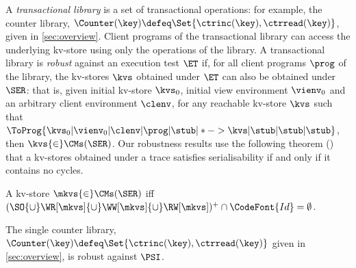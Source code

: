 A {\em transactional library}  is a set of transactional operations: for example, the counter
library, 
$\Counter(\key) \defeq \Set{\ctrinc(\key), \ctrread(\key)}$, given  in \cref{sec:overview}.  Client
programs of the transactional library can access the underlying kv-store using only
the operations of the library.
A transactional library  is \emph{robust} against an execution test $\ET$
if, for all client programs \( \prog \) of the library, 
the kv-stores \( \kvs \) obtained under $\ET$ can also be obtained
under $\SER$:
that is, 
given initial kv-store \( \kvs_0 \), initial view environment \( \vienv_0 \) and an arbitrary client environment \( \clenv \),
for any reachable kv-store \( \kvs \) such that
\( \ToProg{\kvs_0 | \vienv_0 | \clenv | \prog | \stub | * -> \kvs |
  \stub | \stub | \stub }\),
then \( \kvs {\in} \CMs(\SER) \). Our robustness results use the
following theorem () that a kv-stores
obtained under a trace satisfies serialisability if and only if  it contains no cycles. %

 \SpaceAboveDef
\begin{theorem}
\label{thm:serialisable_nocycle}
A kv-store $\mkvs {\in} \CMs(\SER)$ iff $(\SO {\cup} \WR[\mkvs] 
{\cup} \WW[\mkvs] {\cup} \RW[\mkvs])^{+} \cap \CodeFont{Id} = \emptyset$.
\end{theorem}
\SpaceBelowDef

\SpaceAboveDef
\begin{theorem}
\label{thm:singlecounterrobustness}
The single counter library, $\Counter(\key) \defeq \Set{\ctrinc(\key),
  \ctrread(\key)}$ given in \cref{sec:overview},  is robust against
\(\PSI\). 
\end{theorem}
\SpaceBelowDef


